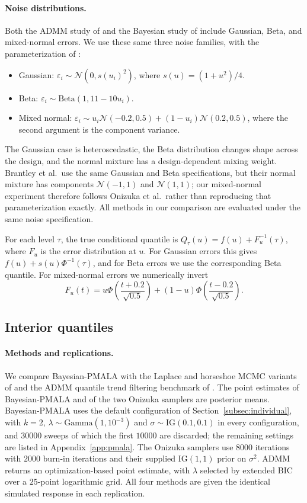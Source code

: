 \paragraph{Noise distributions.} Both the ADMM study of \citet{brantley2020baseline} and the Bayesian study of \citet{onizuka2024fast} include Gaussian, Beta, and mixed-normal errors. We use these same three noise families, with the parameterization of \citet{onizuka2024fast}:
\begin{itemize}
 \item Gaussian: $\varepsilon_i\sim\mathcal{N}(0,s(u_i)^2)$, where $s(u)=(1+u^2)/4$.
 \item Beta: $\varepsilon_i\sim\mathrm{Beta}(1,11-10u_i)$.
 \item Mixed normal: $\varepsilon_i\sim u_i\mathcal{N}(-0.2,0.5)+(1-u_i)\mathcal{N}(0.2,0.5)$, where the second argument is the component variance.
\end{itemize}
The Gaussian case is heteroscedastic, the Beta distribution changes shape across the design, and the normal mixture has a design-dependent mixing weight. Brantley et al.\ use the same Gaussian and Beta specifications, but their normal mixture has components $\mathcal{N}(-1,1)$ and $\mathcal{N}(1,1)$; our mixed-normal experiment therefore follows Onizuka et al.\ rather than reproducing that parameterization exactly. All methods in our comparison are evaluated under the same noise specification.

For each level $\tau$, the true conditional quantile is $Q_\tau(u)=f(u)+F_u^{-1}(\tau)$, where $F_u$ is the error distribution at $u$. For Gaussian errors this gives $f(u)+s(u)\Phi^{-1}(\tau)$, and for Beta errors we use the corresponding Beta quantile. For mixed-normal errors we numerically invert
\[
 F_u(t)=u\Phi\!\left(\frac{t+0.2}{\sqrt{0.5}}\right)
       +(1-u)\Phi\!\left(\frac{t-0.2}{\sqrt{0.5}}\right).
\]

\subsection{Interior quantiles}
\label{sec:sim:individual}

\paragraph{Methods and replications.} We compare Bayesian-PMALA with the Laplace and horseshoe MCMC variants of \citet{onizuka2024fast} and the ADMM quantile trend filtering benchmark of \citet{brantley2020baseline}. The point estimates of Bayesian-PMALA and of the two Onizuka samplers are posterior means. Bayesian-PMALA uses the default configuration of Section~\ref{subsec:individual}, with $k=2$, $\lambda\sim\mathrm{Gamma}(1,10^{-3})$ and $\sigma\sim\mathrm{IG}(0.1,0.1)$ in every configuration, and $30000$ sweeps of which the first $10000$ are discarded; the remaining settings are listed in Appendix~\ref{app:pmala}. The Onizuka samplers use $8000$ iterations with $2000$ burn-in iterations and their supplied $\mathrm{IG}(1,1)$ prior on $\sigma^2$. ADMM returns an optimization-based point estimate, with $\lambda$ selected by extended BIC over a $25$-point logarithmic grid. All four methods are given the identical simulated response in each replication.

